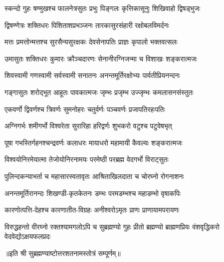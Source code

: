 
\twolineshloka
{स्कन्दो गुहः षण्मुखश्च फालनेत्रसुतः प्रभुः}
{पिङ्गलः कृत्तिकासूनुः शिखिवाहो द्विषड्भुजः}%

\twolineshloka
{द्विषण्णेत्रः शक्तिधरः पिशिताशप्रभञ्जनः}
{तारकासुरसंहारी रक्षोबलविमर्दनः}%

\twolineshloka
{मत्तः प्रमत्तोन्मत्तश्च सुरसैन्यसुरक्षकः}
{देवसेनापतिः प्राज्ञः कृपालो भक्तवत्सलः}%

\twolineshloka
{उमासुतः शक्तिधरः कुमारः क्रौञ्चदारणः}
{सेनानीरग्निजन्मा च विशाखः शङ्करात्मजः}%

\twolineshloka
{शिवस्वामी गणस्वामी सर्वस्वामी सनातनः}
{अनन्तमूर्तिरक्षोभ्यः पार्वतीप्रियनन्दनः}%

\twolineshloka
{गङ्गासुतः शरोद्भूत आहूतः पावकात्मजः}
{जृम्भः प्रजृम्भ उज्जृम्भः कमलासनसंस्तुतः}%

\twolineshloka
{एकवर्णो द्विवर्णश्च त्रिवर्णः सुमनोहरः}
{चतुर्वर्णः पञ्चवर्णः प्रजापतिरहःपतिः}%

\twolineshloka
{अग्निगर्भः शमीगर्भो विश्वरेता सुरारिहा}
{हरिद्वर्णः शुभकरो वटुश्च पटुवेषभृत्}%

\twolineshloka
{पूषा गभस्तिर्गहनश्चन्द्रवर्णः कलाधरः}
{मायाधरो महामायी कैवल्यः शङ्करात्मजः}%

\twolineshloka
{विश्वयोनिरमेयात्मा तेजोयोनिरनामयः}
{परमेष्ठी परब्रह्म वेदगर्भो विराट्सुतः}%

\twolineshloka
{पुलिन्दकन्याभर्ता च महासारस्वतावृतः}
{आश्रिताखिलदाता च चोरघ्नो रोगनाशनः}%

\twolineshloka
{अनन्तमूर्तिरानन्दः शिखण्डी-कृतकेतनः}
{डम्भः परमडम्भश्च महाडम्भो वृषाकपिः}%

\twolineshloka
{कारणोत्पत्ति-देहश्च कारणातीत-विग्रहः}
{अनीश्वरोऽमृतः प्राणः प्राणायामपरायणः}%

\threelineshloka
{विरुद्धहन्तो वीरघ्नो रक्तश्यामगलोऽपि च}
{सुब्रह्मण्यो गुहः प्रीतो ब्रह्मण्यो ब्राह्मणप्रियः}
{वंशवृद्धिकरो वेदवेद्योऽक्षयफलप्रदः}%

॥इति श्री सुब्रह्मण्याष्टोत्तरशतनामस्तोत्रं सम्पूर्णम्॥